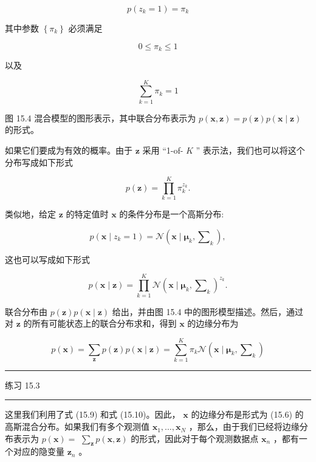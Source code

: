 \documentclass[10pt]{article}
\newcommand{\HRule}{\begin{center}\rule{0.9\linewidth}{0.2mm}\end{center}}
\begin{document}
\[
p\left( {{z}_{k} = 1}\right)  = {\pi }_{k}
\]

其中参数 \(\left\{  {\pi }_{k}\right\}\) 必须满足

\[
0 \leq  {\pi }_{k} \leq  1 \tag{15.7}
\]

以及

\[
\mathop{\sum }\limits_{{k = 1}}^{K}{\pi }_{k} = 1 \tag{15.8}
\]

图 15.4 混合模型的图形表示，其中联合分布表示为 \(p\left( {\mathbf{x},\mathbf{z}}\right)  = p\left( \mathbf{z}\right) p\left( {\mathbf{x} \mid  \mathbf{z}}\right)\) 的形式。

如果它们要成为有效的概率。由于 \(\mathbf{z}\) 采用 “1-of- \(K\) ” 表示法，我们也可以将这个分布写成如下形式

\[
p\left( \mathbf{z}\right)  = \mathop{\prod }\limits_{{k = 1}}^{K}{\pi }_{k}^{{z}_{k}}. \tag{15.9}
\]

类似地，给定 \(\mathbf{z}\) 的特定值时 \(\mathbf{x}\) 的条件分布是一个高斯分布:

\[
p\left( {\mathbf{x} \mid  {z}_{k} = 1}\right)  = \mathcal{N}\left( {\mathbf{x} \mid  {\mathbf{\mu }}_{k},{\mathbf{\sum }}_{k}}\right) ,
\]

这也可以写成如下形式

\[
p\left( {\mathbf{x} \mid  \mathbf{z}}\right)  = \mathop{\prod }\limits_{{k = 1}}^{K}\mathcal{N}{\left( \mathbf{x} \mid  {\mathbf{\mu }}_{k},{\mathbf{\sum }}_{k}\right) }^{{z}_{k}}. \tag{15.10}
\]

联合分布由 \(p\left( \mathbf{z}\right) p\left( {\mathbf{x} \mid  \mathbf{z}}\right)\) 给出，并由图 15.4 中的图形模型描述。然后，通过对 \(\mathbf{z}\) 的所有可能状态上的联合分布求和，得到 \(\mathbf{x}\) 的边缘分布为

\[
p\left( \mathbf{x}\right)  = \mathop{\sum }\limits_{\mathbf{z}}p\left( \mathbf{z}\right) p\left( {\mathbf{x} \mid  \mathbf{z}}\right)  = \mathop{\sum }\limits_{{k = 1}}^{K}{\pi }_{k}\mathcal{N}\left( {\mathbf{x} \mid  {\mathbf{\mu }}_{k},{\mathbf{\sum }}_{k}}\right)  \tag{15.11}
\]

\HRule

练习 15.3

\HRule

这里我们利用了式 (15.9) 和式 (15.10)。因此， \(\mathbf{x}\) 的边缘分布是形式为 (15.6) 的高斯混合分布。如果我们有多个观测值 \({\mathbf{x}}_{1},\ldots ,{\mathbf{x}}_{N}\) ，那么，由于我们已经将边缘分布表示为 \(p\left( \mathbf{x}\right)  =\)  \(\mathop{\sum }\limits_{\mathbf{z}}p\left( {\mathbf{x},\mathbf{z}}\right)\) 的形式，因此对于每个观测数据点 \({\mathbf{x}}_{n}\) ，都有一个对应的隐变量 \({\mathbf{z}}_{n}\) 。
\end{document}
